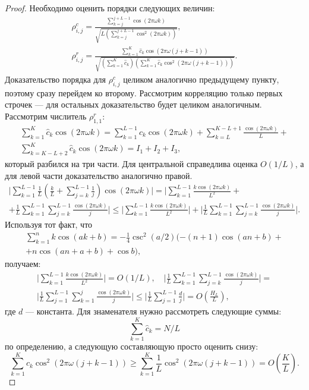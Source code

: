 \documentclass[12pt,a4paper,fleqn,leqno]{article}
\begin{document}
\begin{proof}
Необходимо оценить порядки следующих величин:
\begin{gather*}
\rho^c_{i,j} = \frac{\sum_{k=j}^{j + L - 1} \cos(2 \pi \omega k)}{\sqrt{L (\sum_{k=j}^{j + L - 1} \cos^2(2 \pi \omega k))}}, \\ \rho^r_{i,j} = \frac{\sum_{k=1}^K \hat c_k\cos(2 \pi \omega (j + k - 1))}{\sqrt{(\sum_{k=1}^K \hat c_k) (\sum_{k=1}^K \hat c_k\cos^2(2 \pi \omega (j + k - 1)))}}.
\end{gather*}
Доказательство порядка для $\rho^c_{i,j}$ целиком аналогично предыдущему пункту, поэтому сразу перейдем ко второму. Рассмотрим корреляцию только первых строчек --- для остальных доказательство будет целиком аналогичным. Рассмотрим числитель $\rho^r_{1,1}$:
\begin{gather*}
\sum_{k=1}^K \hat c_k\cos(2 \pi \omega k) = \sum_{k=1}^{L-1} \hat c_k\cos(2 \pi \omega k) + \sum_{k=L}^{K - L + 1} \frac{\cos(2 \pi \omega k)}{L} +\\ \sum_{k=K - L + 2}^{K} \hat c_k\cos(2 \pi \omega k) = I_1 + I_2 + I_3,
\end{gather*}
который разбился на три части. Для центральной справедлива оценка $O(1/L)$, а для левой части доказательство аналогично правой.
\begin{gather*}
\bigg|\sum_{k=1}^{L-1}\frac{1}{L}\left(\frac{k}{L} + \sum_{j=k}^{L-1} \frac{1}{j} \right) \cos(2 \pi \omega k)\bigg| = \bigg|\sum_{k=1}^{L-1} \frac{k \cos(2 \pi \omega k)}{L^2} + \\ + \frac{1}{L}\sum_{k = 1}^{L-1}\sum_{j = k}^{L-1}\frac{\cos(2 \pi \omega k)}{j}\bigg| \le
\bigg|\sum_{k=1}^{L-1} \frac{k \cos(2 \pi \omega k)}{L^2}\bigg| + \bigg|\frac{1}{L}\sum_{k = 1}^{L-1}\sum_{j = k}^{L-1}\frac{\cos(2 \pi \omega k)}{j}\bigg|.
\end{gather*}
Используя тот факт, что
\begin{gather*}
\sum_{k=1}^n k \cos(ak + b) = -\frac{1}{4}\csc^2(a/2)(-(n+1)\cos(an+b) + \\ + n\cos(an + a + b) + \cos b),
\end{gather*}
получаем:
\begin{gather*}
\bigg|\sum_{k=1}^{L-1} \frac{k \cos(2 \pi \omega k)}{L^2}\bigg| = O(1/L), \quad
\bigg|\frac{1}{L}\sum_{k = 1}^{L-1}\sum_{j = k}^{L-1}\frac{\cos(2 \pi \omega k)}{j}\bigg| = \\ \bigg|\frac{1}{L}\sum_{j = 1}^{L-1}\sum_{k = 1}^{j}\frac{\cos(2 \pi \omega k)}{j}\bigg| \le \bigg|\frac{1}{L}\sum_{j = 1}^{L-1}\frac{d}{j}\bigg| = O \left(\frac{H_L}{L} \right),
\end{gather*}
где $d$ --- константа. Для знаменателя нужно рассмотреть следующие суммы:
\begin{equation*}
\sum_{k=1}^K \hat c_k = N / L
\end{equation*}
по определению, а следующую составляющую просто оценить снизу:
\begin{equation*}
\sum_{k=1}^K \hat c_k\cos^2(2 \pi \omega (j + k - 1)) \ge \sum_{k=1}^K \frac{1}{L}\cos^2(2 \pi \omega (j + k - 1)) = O \left(\frac{K}{L} \right).
\end{equation*}
\end{proof}
 
\end{document}
